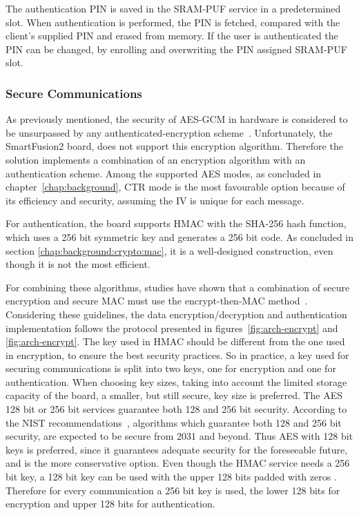 The authentication PIN is saved in the SRAM-PUF service in a predetermined slot. When authentication is performed, the PIN is fetched, compared with the client's supplied PIN and erased from memory.
If the user is authenticated the PIN can be changed, by enrolling and overwriting the PIN assigned SRAM-PUF slot.

\subsubsection*{Secure Communications}

As previously mentioned, the security of \ac{AES}-\ac{GCM} in hardware is considered to be unsurpassed by any authenticated-encryption scheme~\cite{aesmodes}.
Unfortunately, the SmartFusion2 board, does not support this encryption algorithm.
Therefore the solution implements a combination of an encryption algorithm with an authentication scheme. Among the supported \ac{AES} modes, as concluded in chapter~\ref{chap:background}, CTR mode is the most favourable option because of its efficiency and security, assuming the IV is unique for each message.

For authentication, the board supports \ac{HMAC} with the \ac{SHA}-256 hash function, which uses a 256 bit symmetric key and generates a 256 bit code. As concluded in section \ref{chap:background:crypto:mac}, it is a well-designed construction, even though it is not the most efficient.

For combining these algorithms, studies have shown that a combination of secure encryption and secure \ac{MAC} must use the encrypt-then-MAC method~\cite{encryptmacorder}.
Considering these guidelines, the data encryption/decryption and authentication implementation follows the protocol presented in figures~\ref{fig:arch-encrypt} and \ref{fig:arch-encrypt}.
The key used in HMAC should be different from the one used in encryption, to ensure the best security practices. So in practice, a key used for securing communications is split into two keys, one for encryption and one for authentication.
When choosing key sizes, taking into account the limited storage capacity of the board, a smaller, but still secure, key size is preferred. The \ac{AES} 128 bit or 256 bit services guarantee both 128 and 256 bit security. According to the \ac{NIST} recommendations~\cite{nistRecommendations}, algorithms which guarantee both 128 and 256 bit security, are expected to be secure from 2031 and beyond. Thus \ac{AES} with 128 bit keys is preferred, since it guarantees adequate security for the foreseeable future, and is the more conservative option.
Even though the HMAC service needs a 256 bit key, a 128 bit key can be used with the upper 128 bits padded with zeros \cite{smartfusionSecurityPractices}.
Therefore for every communication a 256 bit key is used, the lower 128 bits for encryption and upper 128 bits for authentication.

